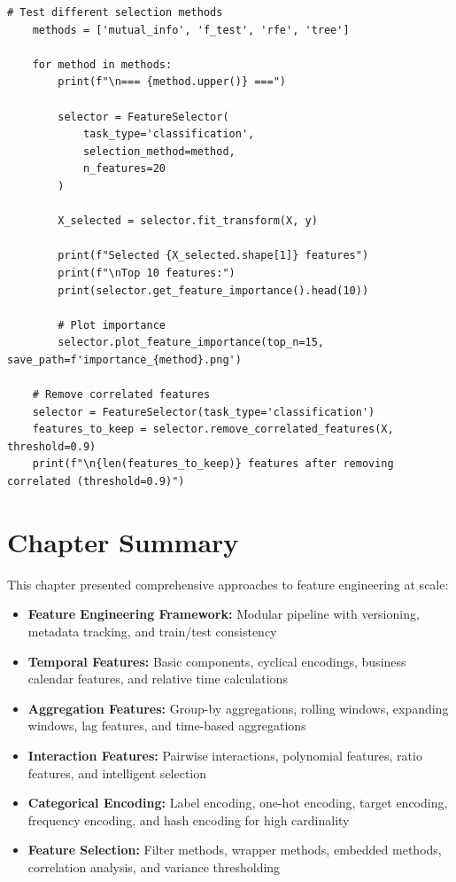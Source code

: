 \begin{lstlisting}[style=python, caption={Comprehensive Feature Selection Framework}]
    # Test different selection methods
    methods = ['mutual_info', 'f_test', 'rfe', 'tree']

    for method in methods:
        print(f"\n=== {method.upper()} ===")

        selector = FeatureSelector(
            task_type='classification',
            selection_method=method,
            n_features=20
        )

        X_selected = selector.fit_transform(X, y)

        print(f"Selected {X_selected.shape[1]} features")
        print(f"\nTop 10 features:")
        print(selector.get_feature_importance().head(10))

        # Plot importance
        selector.plot_feature_importance(top_n=15, save_path=f'importance_{method}.png')

    # Remove correlated features
    selector = FeatureSelector(task_type='classification')
    features_to_keep = selector.remove_correlated_features(X, threshold=0.9)
    print(f"\n{len(features_to_keep)} features after removing correlated (threshold=0.9)")
\end{lstlisting}

\section{Chapter Summary}

This chapter presented comprehensive approaches to feature engineering at scale:

\begin{itemize}
    \item \textbf{Feature Engineering Framework:} Modular pipeline with versioning, metadata tracking, and train/test consistency

    \item \textbf{Temporal Features:} Basic components, cyclical encodings, business calendar features, and relative time calculations

    \item \textbf{Aggregation Features:} Group-by aggregations, rolling windows, expanding windows, lag features, and time-based aggregations

    \item \textbf{Interaction Features:} Pairwise interactions, polynomial features, ratio features, and intelligent selection

    \item \textbf{Categorical Encoding:} Label encoding, one-hot encoding, target encoding, frequency encoding, and hash encoding for high cardinality

    \item \textbf{Feature Selection:} Filter methods, wrapper methods, embedded methods, correlation analysis, and variance thresholding
\end{itemize}

